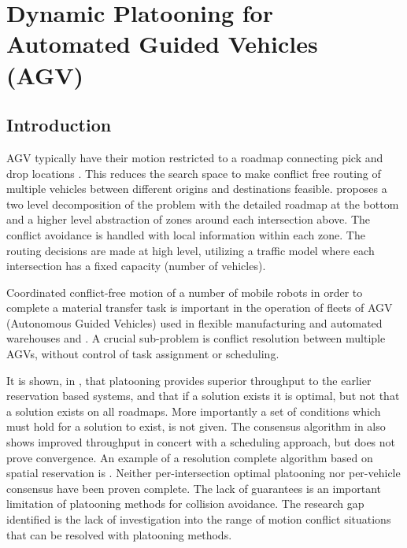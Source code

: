 \chapter{Dynamic Platooning for Automated Guided Vehicles (AGV)}



\section{Introduction}
AGV typically have their motion restricted to a roadmap connecting pick and drop locations \cite{Cardarelli2017}. This reduces the search space to make conflict free routing of multiple vehicles between different origins and destinations feasible. \cite{Digani2015} proposes a two level decomposition of the problem with the detailed roadmap at the bottom and a higher level abstraction of zones around each intersection above. The conflict avoidance is handled with local information within each zone. The routing decisions are made at high level, utilizing a traffic model where each intersection has a fixed capacity (number of vehicles). 
 
Coordinated conflict-free motion of a number of mobile robots in order to complete a material transfer task is important in the operation of fleets of AGV (Autonomous Guided Vehicles) used in flexible manufacturing and automated warehouses \cite{Vis2006} and \cite{Dotoli2019}. A crucial sub-problem is conflict resolution between multiple AGVs, without control of task assignment or scheduling.

It is shown, in \cite{Digani2019}, that platooning provides superior throughput to the earlier reservation based systems, and that if a solution exists it is optimal, but not that a solution exists on all roadmaps. More importantly a set of conditions which must hold for a solution to exist, is not given. The consensus algorithm in \cite{Tadano2019} also shows improved throughput in concert with a scheduling approach, but does not prove convergence. 
An example of a resolution complete algorithm based on spatial reservation is \cite{Draganjac2020}. Neither per-intersection optimal platooning nor per-vehicle consensus have been proven complete. The lack of guarantees is an important limitation of platooning methods for collision avoidance. The research gap identified is the lack of investigation into the range of motion conflict situations that can be resolved with platooning methods.

